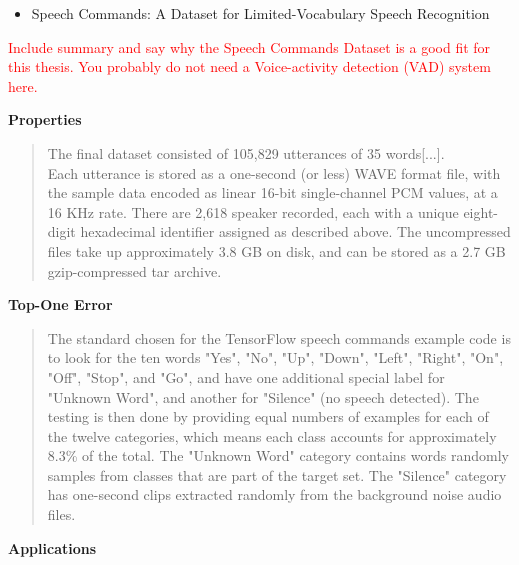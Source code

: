 \documentclass{article}
\theoremstyle{definition}
\theoremstyle{remark}
\begin{document}
\begin{itemize}
	\item Speech Commands: A Dataset for Limited-Vocabulary Speech Recognition \cite{warden2018speech}
\end{itemize}	

\textcolor{red}{Include summary and say why the Speech Commands Dataset is a good fit for this thesis. You probably do not need a Voice-activity detection (VAD) system here.}


\textbf{Properties}

\begin{quote}
The final dataset consisted of 105,829 utterances of 35 words[...].\\
Each utterance is stored as a one-second (or less) WAVE format file, with the sample data encoded as linear 16-bit single-channel PCM values, at a 16 KHz rate. There are 2,618 speaker recorded, each with a unique eight-digit hexadecimal identifier assigned as described above. The uncompressed files take up approximately 3.8 GB on disk, and can be stored as a 2.7 GB gzip-compressed tar archive.
\end{quote}

\textbf{Top-One Error}

\begin{quote}
The standard chosen for the TensorFlow speech commands example code is to look for the ten words "Yes", "No", "Up", "Down", "Left", "Right", "On", "Off", "Stop", and "Go", and have one additional special label for "Unknown Word", and another for "Silence" (no speech detected). The testing is then done by providing equal numbers of examples for each of the twelve categories, which means each class accounts for approximately 8.3\% of the total. The "Unknown Word" category contains words randomly samples from classes that are part of the target set. The "Silence" category has one-second clips extracted randomly from the background noise audio files.
\end{quote}

\textbf{Applications}
\end{document}
